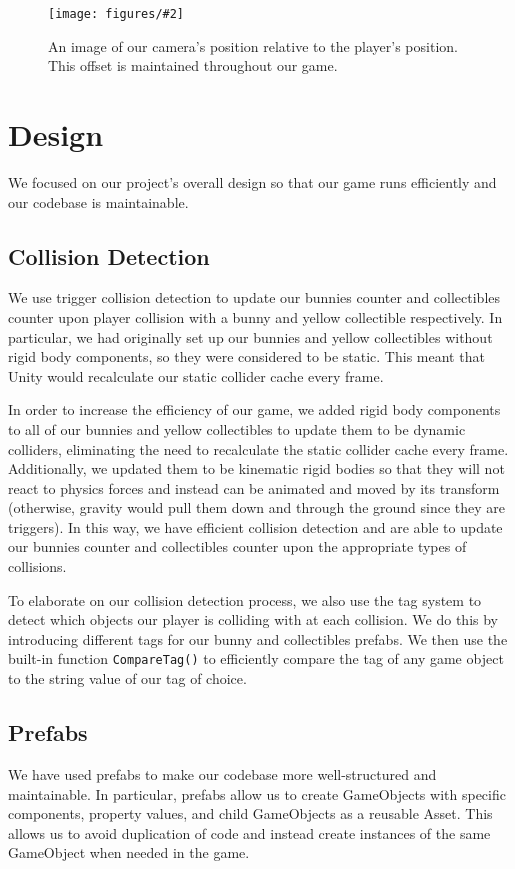 \documentclass[12pt]{article}
\newcommand{\sfig}[3]{\begin{figure}[!ht]
\begin{center}
\texttt{[image: figures/\#2]}
\caption{#3}
\label{#2}
\end{center}
\end{figure}}
\begin{document}
  \sfig{4.5in}{camera}{An image of our camera's position relative to the player's position. This offset is maintained throughout our game.}

  

\section{Design}
  We focused on our project's overall design so that our game runs efficiently and our codebase is maintainable.

\subsection{Collision Detection}
  We use trigger collision detection to update our bunnies counter and collectibles counter upon player collision with a bunny and yellow collectible respectively.
  In particular, we had originally set up our bunnies and yellow collectibles without rigid body components, so they were considered to be static. This meant that Unity would recalculate our static collider cache every frame. 

  In order to increase the efficiency of our game, we added rigid body components to all of our bunnies and yellow collectibles to update them to be dynamic colliders, eliminating the need to recalculate the static collider cache every frame. Additionally, we updated them to be kinematic rigid bodies so that they will not react to physics forces and instead can be animated and moved by its transform (otherwise, gravity would pull them down and through the ground since they are triggers). 
  In this way, we have efficient collision detection and are able to update our bunnies counter and collectibles counter upon the appropriate types of collisions. 

  To elaborate on our collision detection process, we also use the tag system to detect which objects our player is colliding with at each collision. We do this by introducing different tags for our bunny and collectibles prefabs. We then use the built-in function \verb+CompareTag()+ to efficiently compare the tag of any game object to the string value of our tag of choice. 

\subsection{Prefabs}
  We have used prefabs to make our codebase more well-structured and maintainable.
  In particular, prefabs allow us to create GameObjects with specific components, property values, and child GameObjects as a reusable Asset. This allows us to avoid duplication of code and instead create instances of the same GameObject when needed in the game. 
\end{document}
